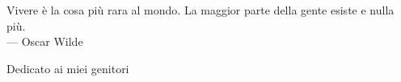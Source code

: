 
\cleardoublepage
{}
\thispagestyle{empty}

\vspace*{3cm}

\begin{center}
Vivere è la cosa più rara al mondo. La maggior parte della gente esiste e nulla più. \\ \medskip
--- Oscar Wilde    
\end{center}

\medskip

\begin{center}
Dedicato ai miei genitori
\end{center}